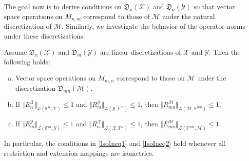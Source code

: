 \documentclass[a4paper]{paper}
\newcommand{\Discr}{\mathfrak{D}}
\newcommand{\VecSpace}[1]{\mathscr{#1}}
\newcommand{\Field}{\mathbb{F}}
\newcommand*{\EXT}[2]{\ensuremath{E_{#1}^{#2}}}
\newcommand*{\REST}[2]{\ensuremath{R_{#1}^{#2}}}
\newcommand*{\RnX}{\ensuremath{\REST{n}{\VecSpace{X}}}}
\newcommand*{\RmY}{\ensuremath{\REST{m}{\VecSpace{Y}}}}
\newcommand*{\EnX}{\ensuremath{\EXT{n}{\VecSpace{X}}}}
\newcommand*{\EmY}{\ensuremath{\EXT{m}{\VecSpace{Y}}}}
\begin{document}
The goal now is to derive conditions on $\Discr_{n}(\VecSpace{X})$ and $\Discr_{n}(\VecSpace{Y})$ so that
vector space operations on $M_{n,m}$ correspond to those of $\VecSpace{M}$ under the natural discretization of $\VecSpace{M}$.
Similarly, we investigate the behavior of the operator norms under these discretizations.
\begin{theorem}
Assume $\Discr_{n}(\VecSpace{X})$ and $ \Discr_{m}(\VecSpace{Y})$ are linear discretizations of 
$\VecSpace{X}$ and $\VecSpace{Y}$. Then the following holds:
\begin{enumerate}[(a)]
\item Vector space operations on $M_{m,n}$ correspond to those on 
$\VecSpace{M}$ under the discretization $\Discr_{m n}(\VecSpace{M})$.
\item If 
  $\Vert \EnX \Vert_{\VecSpace{L}(\Field^n, \VecSpace{X})} \leq 1$
  and 
 $\Vert \RmY \Vert_{\VecSpace{L}(\VecSpace{Y},\Field^m)} \leq 1$,
 then $\Vert R_{m n}^{\VecSpace{M}} \Vert_{\VecSpace{L}(\VecSpace{M},\Field^{mn})} \leq 1$.%
 \label{IsoIneq1}%
\item If 
  $\Vert \EmY \Vert_{\VecSpace{L}(\Field^m, \VecSpace{Y})} \leq 1$ 
  and
  $\Vert \RnX \Vert_{\VecSpace{L}(\VecSpace{X},\Field^n)} \leq 1$, 
  then $\Vert E_{m n}^{\VecSpace{M}} \Vert_{\VecSpace{L}(\Field^{mn}, \VecSpace{M})} \leq 1$.%
  \label{IsoIneq2}%
\end{enumerate}
In particular, the conditions in \eqref{IsoIneq1} and \eqref{IsoIneq2} hold whenever all restriction and extension mappings 
are isometries.
\end{theorem}
\end{document}
